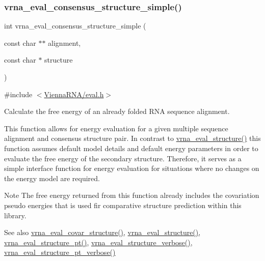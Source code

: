 \subsubsection{\texorpdfstring{vrna\+\_\+eval\+\_\+consensus\+\_\+structure\+\_\+simple()}{vrna\_eval\_consensus\_structure\_simple()}}
{\footnotesize\ttfamily int vrna\+\_\+eval\+\_\+consensus\+\_\+structure\+\_\+simple (\begin{DoxyParamCaption}\item[{const char $\ast$$\ast$}]{alignment,  }\item[{const char $\ast$}]{structure }\end{DoxyParamCaption})}



{\ttfamily \#include $<$\hyperlink{eval_8h}{Vienna\+R\+N\+A/eval.\+h}$>$}



Calculate the free energy of an already folded R\+NA sequence alignment. 

This function allows for energy evaluation for a given multiple sequence alignment and consensus structure pair. In contrast to \hyperlink{group__eval_ga58f199f1438d794a265f3b27fc8ea631}{vrna\+\_\+eval\+\_\+structure()} this function assumes default model details and default energy parameters in order to evaluate the free energy of the secondary structure. Therefore, it serves as a simple interface function for energy evaluation for situations where no changes on the energy model are required.

\begin{DoxyNote}{Note}
The free energy returned from this function already includes the covariation pseudo energies that is used fir comparative structure prediction within this library.
\end{DoxyNote}
\begin{DoxySeeAlso}{See also}
\hyperlink{group__eval_ga6cea75c0eb9857fb59172be54cab09e0}{vrna\+\_\+eval\+\_\+covar\+\_\+structure()}, \hyperlink{group__eval_ga58f199f1438d794a265f3b27fc8ea631}{vrna\+\_\+eval\+\_\+structure()}, \hyperlink{group__eval_gadbd09372ddfd7a450bbd590c96a6bfe4}{vrna\+\_\+eval\+\_\+structure\+\_\+pt()}, \hyperlink{group__eval_ga0928d699d310178f84ee2351034e5cb5}{vrna\+\_\+eval\+\_\+structure\+\_\+verbose()}, \hyperlink{group__eval_ga8a517cfeeae8c376ae7b1e0c401d38b4}{vrna\+\_\+eval\+\_\+structure\+\_\+pt\+\_\+verbose()}
\end{DoxySeeAlso}

